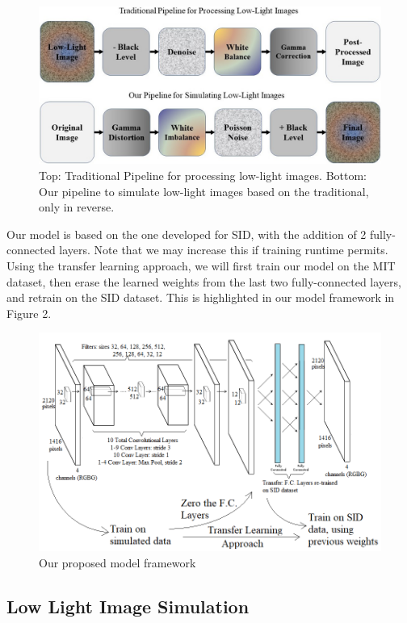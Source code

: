 \documentclass{article}
\begin{document}
\begin{figure}[ht]
  \centering
  \includegraphics[scale=0.35]{pipeline.jpg}
  \caption{Top: Traditional Pipeline for processing low-light images. Bottom: Our  pipeline to simulate low-light images based on the traditional, only in reverse.}
\end{figure}

Our model is based on the one developed for SID, with the addition of 2 fully-connected layers. Note that we may increase this if training runtime permits. Using the transfer learning approach, we will first train our model on the MIT dataset, then erase the learned weights from the last two fully-connected layers, and retrain on the SID dataset. This is highlighted in our model framework in Figure 2. 

\begin{figure}[ht]
  \centering
  \includegraphics[scale=0.5]{model.png}
  \caption{Our proposed model framework}
\end{figure}

\subsection{Low Light Image Simulation}
\end{document}
